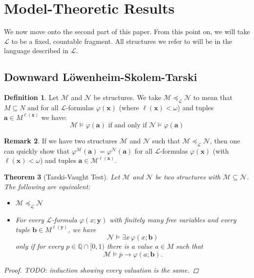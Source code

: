 \documentclass{amsart}
\newtheorem{theorem}{Theorem}[section]
\theoremstyle{definition}
\newtheorem{remark}[theorem]{Remark}
\newtheorem{definition}[theorem]{Definition}
\numberwithin{equation}{theorem}
\renewcommand{\phi}{\varphi}
\newcommand{\Q}{\mathbb{Q}}
\newcommand{\V}{\mathbf}
\newcommand{\rat}[1]{{\overline{#1}}}
\newcommand{\narrow}[1]{\xrightarrow{#1}}
\renewcommand{\to}{\narrow{}}
\newcommand{\len}{\ell}
\newcommand{\frag}{\mathcal{L}}
\begin{document}
\section{Model-Theoretic Results}
We now move onto the second part of this paper.
From this point on, we will take $\frag$ to be a fixed, countable fragment.
All structures we refer to will be in the language described in $\frag$.
\subsection{Downward L\"owenheim-Skolem-Tarski}
\begin{definition}
  Let $\mathcal M$ and $\mathcal N$ be structures.
  We take $\mathcal M\preceq_\mathcal L\mathcal N$ to mean that $M\subseteq N$ and for all $\mathcal L$-formulas $\phi(\V x)$ (where $\len(\V x)<\omega$) and tuples $\V a\in M^{\len(\V x)}$ we have:
  \[
    \mathcal M\models\phi(\V a)\text{ if and only if }\mathcal N\models\phi(\V a)
  \]
\end{definition}

\begin{remark}
  If we have two structures $\mathcal M$ and $\mathcal N$ such that $\mathcal M\preceq_\frag\mathcal N$, then one can quickly show that $\phi^\mathcal M(\V a)=\phi^\mathcal N(\V a)$ for all $\frag$-formulas $\phi(\V x)$ (with $\len(\V x)<\omega$) and tuples $\V a\in\mathcal M^{\len(\V x)}$.
\end{remark}

\begin{theorem}[Tarski-Vaught Test]\label{lem:tarski-vaught-test}
  Let $\mathcal M$ and $\mathcal N$ be two structures with $\mathcal M\subseteq\mathcal N$.
  The following are equivalent:
  \begin{itemize}
  \item $\mathcal M\preceq_\frag\mathcal N$
  \item 
     For every $\mathcal L$-formula $\phi(x;\V y)$ with finitely many free variables and every tuple $\V b\in M^{\len(\V y)}$, we have
     \[
       \mathcal N\models\exists x\,\phi(x;\V b)
     \]
     only if for every $p\in\Q\cap[0,1)$ there is a value $a\in M$ such that
     \[
       \mathcal M\models\rat p\to\phi(a;\V b).
     \]
  \end{itemize}
  \begin{proof}
    TODO: induction showing every valuation is the same.
  \end{proof}
\end{theorem}
\end{document}
